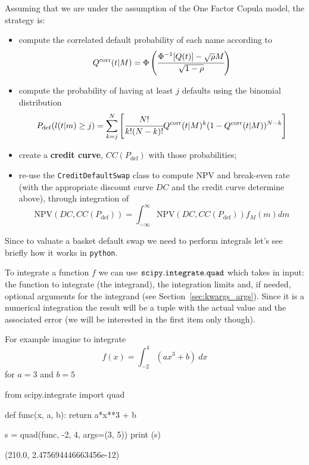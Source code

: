 Assuming that we are under the assumption of the One Factor Copula model, the strategy is:
\begin{itemize}
\item compute the correlated default probability of each name according to 
\begin{equation}
Q^{\textrm{corr}}(t|M) = \Phi\left(\cfrac{\Phi^{-1}[Q(t)]-\sqrt{\rho} M}{\sqrt{1-\rho}}\right)
\end{equation}
\item compute the probability of having at least $j$ defaults using the binomial distribution
\begin{equation}
P_{\mathrm{def}}(l(t|m) \ge j) = \sum_{k=j}^{N}\left[  \cfrac{N!}{k!(N-k)!}Q^{\textrm{corr}}(t|M)^k(1-Q^{\textrm{corr}}(t|M))^{N-k}\right]
\end{equation}
\item create a \textbf{credit curve}, $CC(P_{\mathrm{def}})$ with those probabilities;
\item re-use the \texttt{CreditDefaultSwap} class to compute NPV and break-even rate (with the appropriate discount curve $DC$ and the credit curve determine above), through integration of
\begin{equation}
\mathrm{NPV}(DC, CC(P_{\mathrm{def}})) = \int_{-\infty}^{\infty}{\mathrm{NPV}(DC, CC(P_{\mathrm{def}})) f_M(m)dm} 
\end{equation}
\end{itemize}

Since to valuate a basket default swap we need to perform integrals let's see briefly how it works in \texttt{python}.

To integrate a function \(f\) we can use \(\tt{scipy.integrate.quad}\) which takes in input: the function to integrate (the integrand), the integration limits and, if needed, optional arguments for the integrand (see Section~\ref{sec:kwargs_args}). Since it is a numerical integration the result will be a tuple with the actual value and the associated error (we will be interested in the first item only though).

For example imagine to integrate
\[f(x) = \int_{-2}^{4}(ax^{3} + b)~dx\]
for \(a=3\) and \(b=5\)

\begin{ipython}
from scipy.integrate import quad

def func(x, a, b):
    return a*x**3 + b

s = quad(func, -2, 4, args=(3, 5))
print (s)
\end{ipython}
\begin{ioutput}
(210.0, 2.475694446663456e-12)
\end{ioutput}


